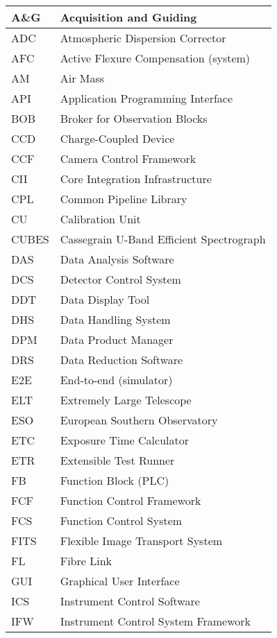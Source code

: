 \begin{longtable*}{ |l|l| }
\hline
A\&G & Acquisition and Guiding \\ \hline
ADC & Atmospheric Dispersion Corrector \\ \hline
AFC & Active Flexure Compensation (system) \\ \hline
AM & Air Mass \\ \hline
API & Application Programming Interface \\ \hline
BOB & Broker for Observation Blocks \\ \hline
CCD & Charge-Coupled Device \\ \hline
CCF & Camera Control Framework \\ \hline
CII & Core Integration Infrastructure \\ \hline
CPL & Common Pipeline Library \\ \hline
CU & Calibration Unit \\ \hline
CUBES & Cassegrain U-Band Efficient Spectrograph \\ \hline
DAS & Data Analysis Software \\ \hline
DCS & Detector Control System \\ \hline
DDT & Data Display Tool \\ \hline
DHS & Data Handling System \\ \hline
DPM & Data Product Manager \\ \hline
DRS & Data Reduction Software \\ \hline
E2E & End-to-end (simulator) \\ \hline
ELT & Extremely Large Telescope \\ \hline
ESO & European Southern Observatory \\ \hline
ETC & Exposure Time Calculator \\ \hline
ETR & Extensible Test Runner \\ \hline
FB & Function Block (PLC) \\ \hline
FCF & Function Control Framework \\ \hline
FCS & Function Control System \\ \hline
FITS & Flexible Image Transport System \\ \hline
FL & Fibre Link \\ \hline
GUI & Graphical User Interface \\ \hline
ICS & Instrument Control Software \\ \hline
IFW & Instrument Control System Framework \\ \hline

\end{longtable*}
